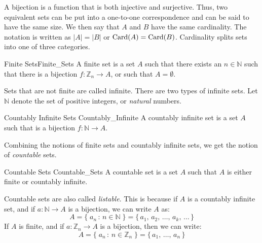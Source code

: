             A bijection is a function that is both injective and
            surjective. Thus, two equivalent sets can be put
            into a one-to-one correspondence and can be said to
            have the same size. We then say that $A$ and $B$
            have the same cardinality. The notation is written
            as $|A|=|B|$ or $\operatorname{Card}(A)=\operatorname{Card}(B)$. Cardinality
            splits sets into one of three categories.
            \begin{ldefinition}{Finite Sets}{Finite_Sets}
                A finite set is a set $A$ such that there exists
                an $n\in\mathbb{N}$ such that there is a
                bijection $f:\mathbb{Z}_{n}\rightarrow{A}$, or
                such that $A=\emptyset$.
            \end{ldefinition}
            Sets that are not finite are called infinite. There
            are two types of infinite sets. Let $\mathbb{N}$
            denote the set of positive integers, or
            \textit{natural} numbers.
            \begin{ldefinition}{Countably Infinite Sets}
                  {Countably_Infinite}
                A countably infinite set is a set $A$ such that
                is a bijection $f:\mathbb{N}\rightarrow{A}$.
            \end{ldefinition}
            Combining the notions of finite sets and countably
            infinite sets, we get the notion of
            \textit{countable} sets.
            \begin{ldefinition}{Countable Sets}
                  {Countable_Sets}
                A countable set is a set $A$ such that $A$ is
                either finite or countably infinite.
            \end{ldefinition}
            Countable sets are also called \textit{listable}.
            This is because if $A$ is a countably infinite set,
            and if $a:\mathbb{N}\rightarrow{A}$ is a bijection,
            we can write $A$ as:
            \begin{equation}
                A=\{\;a_{n}\,:\,n\in\mathbb{N}\;\}
                =\{\,a_{1},\,a_{2},\,\dots,\,a_{k},\,\dots\,\}
            \end{equation}
            If $A$ is finite, and if
            $a:\mathbb{Z}_{n}\rightarrow{A}$ is a
            bijection, then we can write:
            \begin{equation}
                A=\{\;a_{n}\,:\,n\in\mathbb{Z}_{n}\;\}
                 =\{\,a_{1},\,\dots,\,a_{n}\,\}
            \end{equation}
